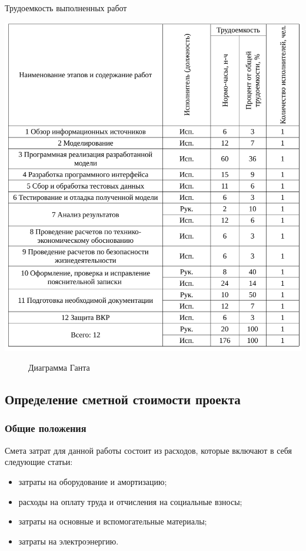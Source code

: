 \begin{table}[ht!]
\caption{Трудоемкость выполненных работ}
\centering
\includegraphics[page=1, width=1\linewidth]{tables/economics/schedule.pdf}
\label{tab:job_is_done_1}
\end{table}


\begin{figure}[h!]
\caption{ Диаграмма Ганта }
\label{grantt:grantt}
\end{figure}



\clearpage
\subsection{Определение сметной стоимости проекта}
\subsubsection{Общие положения}

Смета затрат для данной работы состоит из расходов, которые включают в себя следующие статьи:

\begin{itemize}
\item затраты на оборудование и амортизацию;
\item расходы на оплату труда и отчисления на социальные взносы;
\item затраты на основные и вспомогательные материалы;
\item затраты на электроэнергию.
\end{itemize}
